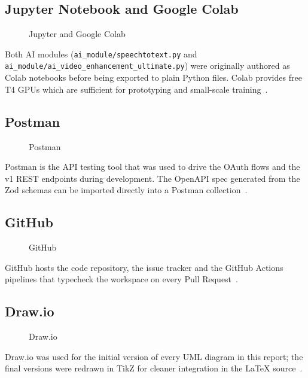 \subsection{Jupyter Notebook and Google Colab}
\label{sec:jupyter}
\begin{figure}[H]
  \centering
  \caption{Jupyter and Google Colab}
  \label{fig:jupyter}
\end{figure}
Both AI modules (\texttt{ai\_module/speechtotext.py} and
\texttt{ai\_module/ai\_video\_enhancement\_ultimate.py}) were originally authored as
Colab notebooks before being exported to plain Python files. Colab provides free T4 GPUs
which are sufficient for prototyping and small-scale training~\cite{colab}.

\subsection{Postman}
\label{sec:postman}
\begin{figure}[H]
  \centering
  \caption{Postman}
  \label{fig:postman}
\end{figure}
Postman is the API testing tool that was used to drive the OAuth flows and the v1 REST
endpoints during development. The OpenAPI spec generated from the Zod schemas can be
imported directly into a Postman collection~\cite{postman}.

\subsection{GitHub}
\label{sec:github}
\begin{figure}[H]
  \centering
  \caption{GitHub}
  \label{fig:github}
\end{figure}
GitHub hosts the code repository, the issue tracker and the GitHub Actions pipelines that
typecheck the workspace on every Pull Request~\cite{github}.

\subsection{Draw.io}
\label{sec:drawio}
\begin{figure}[H]
  \centering
  \caption{Draw.io}
  \label{fig:drawio}
\end{figure}
Draw.io was used for the initial version of every UML diagram in this report; the final
versions were redrawn in TikZ for cleaner integration in the LaTeX source~\cite{drawio}.

